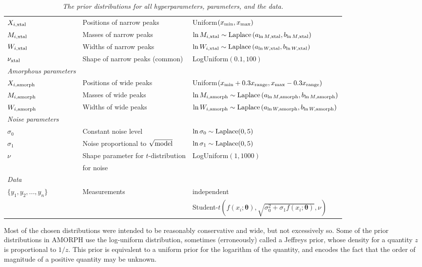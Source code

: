 \documentclass[review]{elsarticle}
\newcommand{\params}{\boldsymbol{\theta}}
\newcommand{\changed}{\color{blue}}
\begin{document}
\begin{table}[!ht]
\begin{tabular}{|lll|}
$X_{i, \rm xtal}$ & Positions of narrow peaks &
                            Uniform$(x_{\rm min}, x_{\rm max})$ \\
$M_{i, \rm xtal}$ & {\changed Masses} of narrow peaks &
{\changed
 $\ln M_{i, \rm xtal} \sim \textnormal{Laplace}\left(a_{\ln M, \rm xtal}, b_{\ln M, \rm xtal}\right)$} \\
$W_{i, \rm xtal}$ & Widths of narrow peaks &
 $\ln W_{i, \rm xtal} \sim \textnormal{Laplace}\left(a_{\ln W, \rm xtal}, b_{\ln W, \rm xtal}\right)$ \\
{\changed $\nu_{\rm xtal}$} &  {\changed Shape of narrow peaks (common)} &  {\changed LogUniform$(0.1, 100)$}\\
\hline
{\em Amorphous parameters}&&\\
$X_{i, \rm amorph}$ & Positions of wide peaks &
          Uniform$(x_{\rm min}+0.3x_{\rm range}, x_{\rm max}-0.3x_{\rm range})$ \\
{\changed $M_{i, \rm amorph}$} &  {\changed Masses} of wide peaks &
 {\changed  $\ln M_{i, \rm amorph} \sim \textnormal{Laplace}\left(a_{\ln M, \rm amorph}, b_{\ln M, \rm amorph}\right)$} \\
$W_{i, \rm amorph}$ & Widths of wide peaks &
 $\ln W_{i, \rm amorph} \sim \textnormal{Laplace}\left(a_{\ln W, \rm amorph}, b_{\ln W, \rm amorph}\right)$ \\
\hline
{\em Noise parameters}&&\\
$\sigma_0$ &    Constant noise level  &   $\ln \sigma_0 \sim \textnormal{Laplace}(0,5)$\\
$\sigma_1$ &    Noise proportional to $\sqrt{\textnormal{model}}$   &  $\ln \sigma_1 \sim \textnormal{Laplace}(0,5)$ \\
$\nu$     &   Shape parameter for $t$-distribution&LogUniform$(1, 1000)$\\ &for noise   &   \\
\hline
{\em Data}&&\\
$\{y_1, y_2, ..., y_n\}$  &   Measurements    & independent \\ && Student-$t\left(f(x_i; \params), \sqrt{\sigma_0^2 + \sigma_1f(x_i; \params)},\nu\right)$\\
\hline
\end{tabular}
\caption{\it The prior distributions for all hyperparameters,
parameters, and the data.\label{tab:priors}}
\end{table}

Most of the chosen distributions were intended to be reasonably
conservative and wide, {\changed but not excessively so}.
Some of the prior distributions in AMORPH use the log-uniform distribution,
sometimes (erroneously) called a Jeffreys prior, whose density for a quantity
$z$ is proportional to $1/z$. {\changed This prior is equivalent to a uniform prior
for the logarithm of the quantity, and encodes the fact that the order of magnitude
of a positive quantity may be unknown.}
\end{document}

